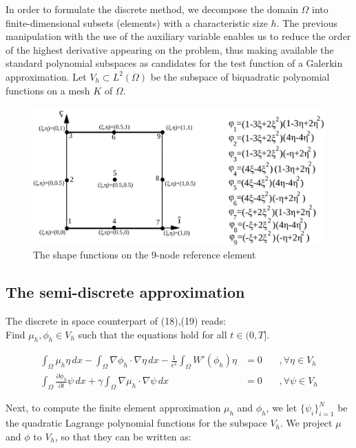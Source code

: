 \documentclass{article}
\begin{document}
In order to formulate the discrete method, we decompose the domain $\Omega$ into finite-dimensional subsets (elements) with a characteristic size $h$. The previous manipulation with the use of the auxiliary variable enables us to reduce the order of the highest derivative appearing on the problem, thus making available the standard polynomial subspaces as candidates for the test function of a Galerkin approximation. Let $V_h \subset L^2(\Omega)$ be the subspace of biquadratic polynomial functions on a mesh $K$ of $\Omega$.
\begin{figure}[!b]
\begin{center}
\includegraphics[scale=0.3]{biquadratic.png}
\caption{The shape functions on the 9-node reference element}\label{Figure1}
\end{center}
\end{figure}

\newpage
\subsection{The semi-discrete approximation}
The discrete in space counterpart of (18),(19) reads:\\


Find $\mu_h, \phi_h \in V_h$ such that the equations hold for all $t \in (0, T]$.

\begin{align}
\int_\Omega \mu_h\eta \, dx -\int_\Omega \nabla\phi_h\cdot \nabla\eta \, dx - \frac{1}{\epsilon^2}\int_\Omega  W'(\phi_h)\eta
&= 0  \:\:\:\:\:\:\:\: ,\forall \eta \in V_h \\
\int_\Omega\frac{\partial \phi_h}{\partial t} \psi \, dx + \gamma\int_\Omega \nabla \mu_h \cdot \nabla \psi \, dx &= 0 
 \:\:\:\:\:\:\:\: ,\forall \psi \in V_h
\end{align}



Next, to compute the finite element approximation $\mu_h$ and $\phi_h$, we let $\{\psi_i\}_{i=1}^N$ be the quadratic Lagrange polynomial functions for the subspace $V_h$. We project $\mu$ and $\phi$ to $V_h$, so that they can be written as:
\end{document}
